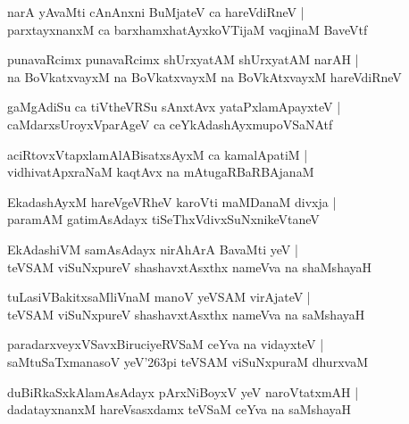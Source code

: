 \begin{shloka}
narA yAvaMti cAnAnxni BuMjateV ca hareVdiRneV |\\
parxtayxnanxM ca barxhamxhatAyxkoVTijaM vaqjinaM BaveVtf
\end{shloka}

\begin{shloka}
punavaRcimx punavaRcimx shUrxyatAM shUrxyatAM narAH |\\
na BoVkatxvayxM na BoVkatxvayxM na BoVkAtxvayxM hareVdiRneV
\end{shloka}

\begin{shloka}
gaMgAdiSu ca tiVtheVRSu sAnxtAvx yataPxlamApayxteV |\\
caMdarxsUroyxVparAgeV ca ceYkAdashAyxmupoVSaNAtf
\end{shloka}

\begin{shloka}
aciRtovxVtapxlamAlABisatxsAyxM ca kamalApatiM |\\
vidhivatApxraNaM kaqtAvx na mAtugaRBaRBAjanaM
\end{shloka}

\begin{shloka}
EkadashAyxM hareVgeVRheV karoVti maMDanaM divxja |\\
paramAM gatimAsAdayx tiSeThxVdivxSuNxnikeVtaneV 
\end{shloka}

\begin{shloka}
EkAdashiVM samAsAdayx nirAhArA BavaMti yeV |\\
teVSAM viSuNxpureV shashavxtAsxthx nameVva na shaMshayaH
\end{shloka}

\begin{shloka}
tuLasiVBakitxsaMliVnaM manoV yeVSAM virAjateV |\\
teVSAM viSuNxpureV shashavxtAsxthx nameVva na saMshayaH 
\end{shloka}

\begin{shloka}
paradarxveyxVSavxBiruciyeRVSaM ceYva na vidayxteV |\\
saMtuSaTxmanasoV yeV\char'263pi teVSAM viSuNxpuraM dhurxvaM
\end{shloka}

\begin{shloka}
duBiRkaSxkAlamAsAdayx pArxNiBoyxV yeV naroVtatxmAH |\\
dadatayxnanxM hareVsasxdamx teVSaM ceYva na saMshayaH 
\end{shloka}

